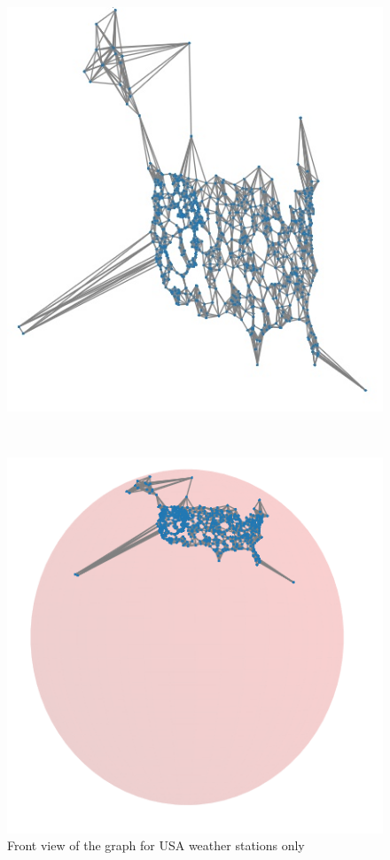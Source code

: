 \documentclass[11pt]{report}
\begin{document}
\begin{figure}[!ht]
\centering
\begin{minipage}{0.8\linewidth}
    \centering
    \includegraphics[width=0.7\linewidth]{USA_temp_2.jpg}
    \caption{Front view of the graph for USA weather stations only}
    \label{fig:USA_graph_front}
\end{minipage}\\
\begin{minipage}{0.4\linewidth}
    \centering
    \includegraphics[width=0.99\linewidth]{USA_temp.png}

\end{minipage}
\end{figure}
\end{document}
